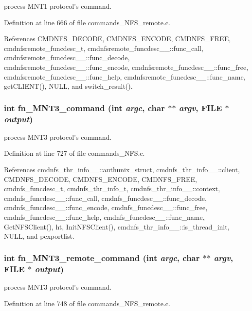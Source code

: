 process MNT1 protocol's command. 

Definition at line 666 of file commands\_\-NFS\_\-remote.c.

References CMDNFS\_\-DECODE, CMDNFS\_\-ENCODE, CMDNFS\_\-FREE, cmdnfsremote\_\-funcdesc\_\-t, cmdnfsremote\_\-funcdesc\_\-\_\-::func\_\-call, cmdnfsremote\_\-funcdesc\_\-\_\-::func\_\-decode, cmdnfsremote\_\-funcdesc\_\-\_\-::func\_\-encode, cmdnfsremote\_\-funcdesc\_\-\_\-::func\_\-free, cmdnfsremote\_\-funcdesc\_\-\_\-::func\_\-help, cmdnfsremote\_\-funcdesc\_\-\_\-::func\_\-name, get\-CLIENT(), NULL, and switch\_\-result().
\subsubsection{\setlength{\rightskip}{0pt plus 5cm}int fn\_\-MNT3\_\-command (int {\em argc}, char $\ast$$\ast$ {\em argv}, FILE $\ast$ {\em output})}\label{commands_8h_a62}


process MNT3 protocol's command. 

Definition at line 727 of file commands\_\-NFS.c.

References cmdnfs\_\-thr\_\-info\_\-\_\-::authunix\_\-struct, cmdnfs\_\-thr\_\-info\_\-\_\-::client, CMDNFS\_\-DECODE, CMDNFS\_\-ENCODE, CMDNFS\_\-FREE, cmdnfs\_\-funcdesc\_\-t, cmdnfs\_\-thr\_\-info\_\-t, cmdnfs\_\-thr\_\-info\_\-\_\-::context, cmdnfs\_\-funcdesc\_\-\_\-::func\_\-call, cmdnfs\_\-funcdesc\_\-\_\-::func\_\-decode, cmdnfs\_\-funcdesc\_\-\_\-::func\_\-encode, cmdnfs\_\-funcdesc\_\-\_\-::func\_\-free, cmdnfs\_\-funcdesc\_\-\_\-::func\_\-help, cmdnfs\_\-funcdesc\_\-\_\-::func\_\-name, Get\-NFSClient(), ht, Init\-NFSClient(), cmdnfs\_\-thr\_\-info\_\-\_\-::is\_\-thread\_\-init, NULL, and pexportlist.
\subsubsection{\setlength{\rightskip}{0pt plus 5cm}int fn\_\-MNT3\_\-remote\_\-command (int {\em argc}, char $\ast$$\ast$ {\em argv}, FILE $\ast$ {\em output})}\label{commands_8h_a83}


process MNT3 protocol's command. 

Definition at line 748 of file commands\_\-NFS\_\-remote.c.

